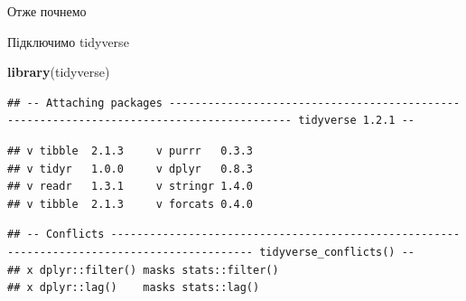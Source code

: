 \documentclass[ignorenonframetext,]{beamer}
\newenvironment{Shaded}{\begin{snugshade}}{\end{snugshade}}
\newcommand{\KeywordTok}[1]{\textcolor[rgb]{0.13,0.29,0.53}{\textbf{#1}}}
\newcommand{\NormalTok}[1]{#1}
\begin{document}
\begin{frame}[fragile]{Отже почнемо}
\protect\hypertarget{ux43eux442ux436ux435-ux43fux43eux447ux43dux435ux43cux43e}{}

Підключимо tidyverse

\begin{Shaded}
\begin{Highlighting}[]
\KeywordTok{library}\NormalTok{(tidyverse)}
\end{Highlighting}
\end{Shaded}

\begin{verbatim}
## -- Attaching packages ----------------------------------------------------------------------------------------- tidyverse 1.2.1 --
\end{verbatim}

\begin{verbatim}
## v tibble  2.1.3     v purrr   0.3.3
## v tidyr   1.0.0     v dplyr   0.8.3
## v readr   1.3.1     v stringr 1.4.0
## v tibble  2.1.3     v forcats 0.4.0
\end{verbatim}

\begin{verbatim}
## -- Conflicts -------------------------------------------------------------------------------------------- tidyverse_conflicts() --
## x dplyr::filter() masks stats::filter()
## x dplyr::lag()    masks stats::lag()
\end{verbatim}

\end{frame}
\end{document}
